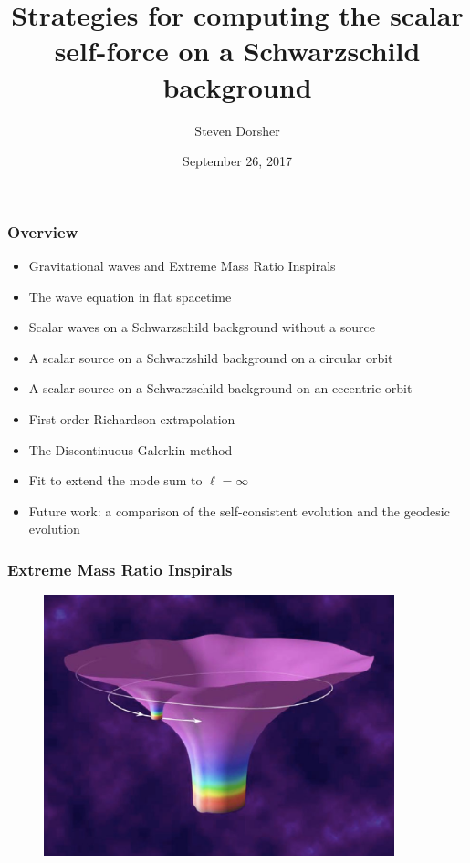 \documentclass{beamer}
\title{Strategies for computing the scalar self-force on a Schwarzschild background}
\author{Steven Dorsher}
\institute{Louisiana State University}
\date{September 26, 2017}
\begin{document}
\frame{\titlepage}


\begin{frame}
  \frametitle{Overview}
  \begin{itemize}
  \item Gravitational waves and Extreme Mass Ratio Inspirals
  \item The wave equation in flat spacetime
  \item Scalar waves on a Schwarzschild background without a source
  \item A scalar source on a Schwarzshild background on a circular orbit
  \item A scalar source on a Schwarzschild background on an eccentric orbit
  \item First order Richardson extrapolation
  \item The Discontinuous Galerkin method
  \item Fit to extend the mode sum to $\ell=\infty$
  \item Future work: a comparison of the self-consistent evolution and the geodesic evolution
  \end{itemize}
\end{frame}


\begin{frame}
  \frametitle{Extreme Mass Ratio Inspirals}
  \begin{figure}
    \includegraphics[width=4.0in]{EMRI}
  \end{figure}
\end{frame}
\end{document}

